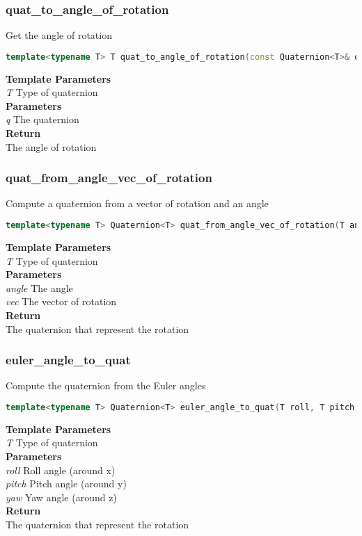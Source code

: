 \subsubsection{quat\_to\_angle\_of\_rotation}
\begin{mdframed}
Get the angle of rotation
\begin{lstlisting}[language=C++]
template<typename T> T quat_to_angle_of_rotation(const Quaternion<T>& q) 
\end{lstlisting}
\textbf{Template Parameters} \\ 
\textit{T} Type of quaternion \\ 
\textbf{Parameters} \\ 
\textit{q} The quaternion \\ 
\textbf{Return} \\ 
The angle of rotation\\ 
\end{mdframed}

\subsubsection{quat\_from\_angle\_vec\_of\_rotation}
\begin{mdframed}
Compute a quaternion from a vector of rotation and  an angle
\begin{lstlisting}[language=C++]
template<typename T> Quaternion<T> quat_from_angle_vec_of_rotation(T angle, Vector<T,3> vec) 
\end{lstlisting}
\textbf{Template Parameters} \\ 
\textit{T} Type of quaternion \\ 
\textbf{Parameters} \\ 
\textit{angle} The angle \\ 
\textit{vec} The vector of rotation \\ 
\textbf{Return} \\ 
The quaternion that represent the rotation\\ 
\end{mdframed}

\subsubsection{euler\_angle\_to\_quat}
\begin{mdframed}
Compute the quaternion from the Euler angles
\begin{lstlisting}[language=C++]
template<typename T> Quaternion<T> euler_angle_to_quat(T roll, T pitch, T yaw) 
\end{lstlisting}
\textbf{Template Parameters} \\ 
\textit{T} Type of quaternion \\ 
\textbf{Parameters} \\ 
\textit{roll} Roll angle (around x) \\ 
\textit{pitch} Pitch angle (around y) \\ 
\textit{yaw} Yaw angle (around z) \\ 
\textbf{Return} \\ 
The quaternion that represent the rotation\\ 
\end{mdframed}

